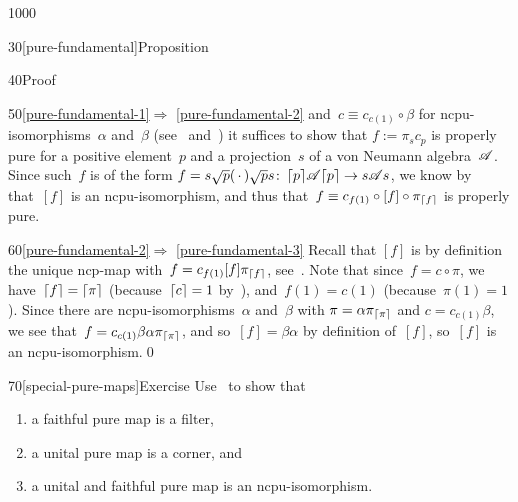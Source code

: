 \begin{parsec}{1000}
\begin{point}{30}[pure-fundamental]{Proposition}
\begin{point}{40}{Proof}
\begin{point}{50}{\ref{pure-fundamental-1}$\Longrightarrow$%
\ref{pure-fundamental-2}}
and~$c\equiv c_{c(1)}\circ \beta$
for ncpu-isomorphisms~$\alpha$ and~$\beta$
(see~
and~)
it suffices to show that
$f:=\pi_{s} c_{p}$ is properly pure
for a positive element~$p$ and a projection~$s$
of a von Neumann algebra~$\mathscr{A}$.
Since such~$f$ is of the form $f=s\sqrt{p}(\,\cdot\,)\sqrt{p}s
\colon \left\lceil p\right\rceil\!\mathscr{A}\!\left\lceil p\right\rceil\to s\mathscr{A} s$,
we know by~
that~$[f]$ is an ncpu-isomorphism,
and thus that~$f\equiv c_{f(1)}\circ [f]\circ \pi_{\left\lceil f\right\rceil}$ is properly pure.
\end{point}
\begin{point}{60}{\ref{pure-fundamental-2}$\Longrightarrow$%
\ref{pure-fundamental-3}}%
Recall that $[f]$
is by definition the unique ncp-map
with~$f = c_{f(1)} [f] \pi_{\left\lceil f\right\rceil}$,
see~.
Note that since~$f=c\circ \pi$,
	we have~$\left\lceil f\right\rceil=\left\lceil\pi\right\rceil$ (because~$\left\lceil c\right\rceil=1$ 
	by~),
and~$f(1)=c(1)$ (because~$\pi(1)=1$).
Since there are ncpu-isomorphisms~$\alpha$ and~$\beta$
with $\pi= \alpha \pi_{\left\lceil\pi\right\rceil}$ and  $c=c_{c(1)} \beta$,
we see that~$f=c_{c(1)} \beta\alpha \pi_{\left\lceil\pi\right\rceil}$,
and so~$[f]=\beta\alpha$
by definition of~$[f]$,
so~$[f]$ is an ncpu-isomorphism.\qed
\end{point}
\end{point}
\end{point}
\begin{point}{70}[special-pure-maps]{Exercise}%
Use~ to show that 
\begin{enumerate}
\item
a faithful pure map is a filter,
\item
a unital pure map is a corner, and
\item
a unital and faithful pure map is an ncpu-isomorphism.
\end{enumerate}
\spacingfix
\end{point}%
\end{parsec}%
